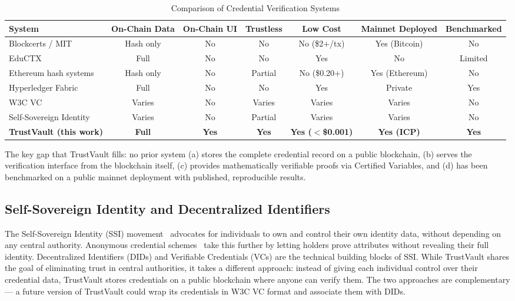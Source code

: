 \documentclass[journal]{IEEEtran}
\begin{document}
\begin{table}[t]
\caption{Comparison of Credential Verification Systems}
\label{tab:related_comparison}
\centering\small\renewcommand{\arraystretch}{1.2}
\begin{tabular}{@{}lcccccc@{}}
\toprule
\textbf{System} & \textbf{On-Chain Data} & \textbf{On-Chain UI} & \textbf{Trustless} & \textbf{Low Cost} & \textbf{Mainnet Deployed} & \textbf{Benchmarked} \\
\midrule
Blockcerts / MIT~\cite{grech2017blockchain}        & Hash only  & No  & No  & No (\$2+/tx)  & Yes (Bitcoin) & No \\
EduCTX~\cite{turk2018eductx}                       & Full       & No  & No  & Yes           & No            & Limited \\
Ethereum hash systems~\cite{lizcano2020blockchain}  & Hash only  & No  & Partial & No (\$0.20+) & Yes (Ethereum) & No \\
Hyperledger Fabric~\cite{androulaki2018fabric}      & Full       & No  & No  & Yes           & Private       & Yes \\
W3C VC~\cite{w3c2022vc}                            & Varies     & No  & Varies & Varies       & Varies        & No \\
Self-Sovereign Identity~\cite{allen2016decentralized} & Varies  & No  & Partial & Varies       & Varies        & No \\
\textbf{TrustVault (this work)}                     & \textbf{Full} & \textbf{Yes} & \textbf{Yes} & \textbf{Yes ($<$\$0.001)} & \textbf{Yes (ICP)} & \textbf{Yes} \\
\bottomrule
\end{tabular}
\end{table}

The key gap that TrustVault fills: no prior system (a) stores the complete credential record on a public blockchain, (b) serves the verification interface from the blockchain itself, (c) provides mathematically verifiable proofs via Certified Variables, and (d) has been benchmarked on a public mainnet deployment with published, reproducible results.

\subsection{Self-Sovereign Identity and Decentralized Identifiers}

The Self-Sovereign Identity (SSI) movement~\cite{allen2016decentralized} advocates for individuals to own and control their own identity data, without depending on any central authority. Anonymous credential schemes~\cite{camenisch2001efficient} take this further by letting holders prove attributes without revealing their full identity. Decentralized Identifiers (DIDs) and Verifiable Credentials (VCs) are the technical building blocks of SSI. While TrustVault shares the goal of eliminating trust in central authorities, it takes a different approach: instead of giving each individual control over their credential data, TrustVault stores credentials on a public blockchain where anyone can verify them. The two approaches are complementary — a future version of TrustVault could wrap its credentials in W3C VC format and associate them with DIDs.
\end{document}
